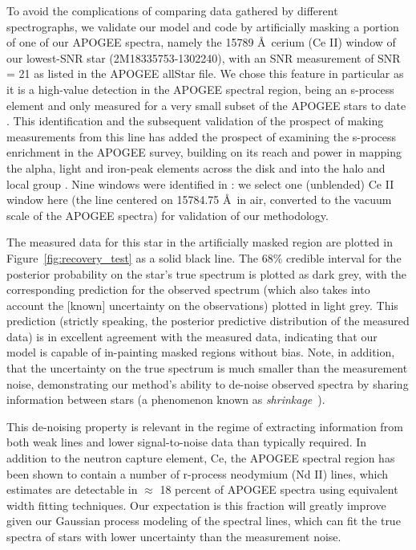 \documentclass[a4paper,fleqn,usenatbib]{mnras}
\begin{document}
To avoid the complications of comparing data gathered by different spectrographs, we validate our model and code by artificially masking a portion of one of our APOGEE spectra, namely the 15789 \AA\ cerium (Ce II) window of our lowest-SNR star (2M18335753-1302240), with an SNR measurement of SNR = 21 as listed in the APOGEE allStar file. We chose this feature in particular as it is a high-value detection in the APOGEE spectral region, being an s-process element and only measured for a very small subset of the APOGEE stars to date \citep{Cunha2017}. This identification and the subsequent validation of the prospect of making measurements from this line has added the prospect of examining the s-process enrichment in the APOGEE survey, building on its reach and power in mapping the alpha, light and iron-peak elements across the disk and into the halo and local group \citep[e.g.,][]{Majewski2017, Nidever2014, Hayden2015, Weinberg2019}. Nine windows were identified in \citet{Cunha2017}: we select one (unblended) Ce II window here (the line centered on 15784.75 \AA\ in air, converted to the vacuum scale of the APOGEE spectra) for validation of our methodology. 


The measured data for this star in the artificially masked region are plotted in Figure~\ref{fig:recovery_test} as a solid black line. The 68\% credible interval for the posterior probability on the star's true spectrum is plotted as dark grey, with the corresponding prediction for the observed spectrum (which also takes into account the [known] uncertainty on the observations) plotted in light grey. This prediction (strictly speaking, the posterior predictive distribution of the measured data) is in excellent agreement with the measured data, indicating that our model is capable of in-painting masked regions without bias. Note, in addition, that the uncertainty on the true spectrum is much smaller than the measurement noise, demonstrating our method's ability to de-noise observed spectra by sharing information between stars (a phenomenon known as {\it shrinkage}~\citep[see, e.g.,][Chapter 13]{Busemeyer_etal:2015}).

This de-noising property is relevant in the regime of extracting information from both weak lines and lower signal-to-noise data than typically required. In addition to the neutron capture element, Ce, the APOGEE spectral region has been shown to contain a number of r-process neodymium (Nd II) lines, which~\citet{Hasselquist_etal:2016} estimates are detectable in $\approx$ 18 percent of APOGEE spectra using equivalent width fitting techniques. Our expectation is this fraction will greatly improve given our Gaussian process modeling of the spectral lines, which can fit the true spectra of stars with lower uncertainty than the measurement noise. 
\end{document}
